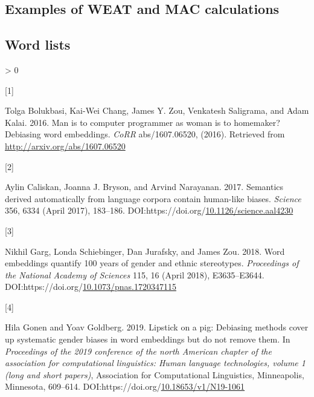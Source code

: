 \documentclass[
  10pt,
  dvipsnames,enabledeprecatedfontcommands, twocolumn]{scrartcl}
\newlength{\cslhangindent}
\newlength{\csllabelwidth}
\newenvironment{CSLReferences}[2] %
 {%
  \setlength{\parindent}{0pt}
  \ifodd #1 \everypar{\setlength{\hangindent}{\cslhangindent}}\ignorespaces\fi
  \ifnum #2 > 0
  \setlength{\parskip}{#2\baselineskip}
  \fi
 }%
 {}
\newcommand{\CSLLeftMargin}[1]{\parbox[t]{\csllabelwidth}{#1}}
\newcommand{\CSLRightInline}[1]{\parbox[t]{\linewidth - \csllabelwidth}{#1}\break}
\begin{document}
\hypertarget{examples-of-weat-and-mac-calculations}{%
\subsection{Examples of WEAT and MAC
calculations}\label{examples-of-weat-and-mac-calculations}}

\hypertarget{word-lists}{%
\subsection*{Word lists}\label{word-lists}}

\hypertarget{refs}{}
\begin{CSLReferences}{0}{0}
\leavevmode\hypertarget{ref-Bolukbasi2016man}{}%
\CSLLeftMargin{{[}1{]} }
\CSLRightInline{Tolga Bolukbasi, Kai-Wei Chang, James Y. Zou, Venkatesh
Saligrama, and Adam Kalai. 2016. Man is to computer programmer as woman
is to homemaker? Debiasing word embeddings. \emph{CoRR} abs/1607.06520,
(2016). Retrieved from \url{http://arxiv.org/abs/1607.06520}}

\leavevmode\hypertarget{ref-Caliskan2017semanticsBiases}{}%
\CSLLeftMargin{{[}2{]} }
\CSLRightInline{Aylin Caliskan, Joanna J. Bryson, and Arvind Narayanan.
2017. Semantics derived automatically from language corpora contain
human-like biases. \emph{Science} 356, 6334 (April 2017), 183--186.
DOI:https://doi.org/\href{https://doi.org/10.1126/science.aal4230}{10.1126/science.aal4230}}

\leavevmode\hypertarget{ref-Garg2018years}{}%
\CSLLeftMargin{{[}3{]} }
\CSLRightInline{Nikhil Garg, Londa Schiebinger, Dan Jurafsky, and James
Zou. 2018. Word embeddings quantify 100 years of gender and ethnic
stereotypes. \emph{Proceedings of the National Academy of Sciences} 115,
16 (April 2018), E3635--E3644.
DOI:https://doi.org/\href{https://doi.org/10.1073/pnas.1720347115}{10.1073/pnas.1720347115}}

\leavevmode\hypertarget{ref-Gonen2019lipstick}{}%
\CSLLeftMargin{{[}4{]} }
\CSLRightInline{Hila Gonen and Yoav Goldberg. 2019. Lipstick on a pig:
{D}ebiasing methods cover up systematic gender biases in word embeddings
but do not remove them. In \emph{Proceedings of the 2019 conference of
the north {A}merican chapter of the association for computational
linguistics: Human language technologies, volume 1 (long and short
papers)}, Association for Computational Linguistics, Minneapolis,
Minnesota, 609--614.
DOI:https://doi.org/\href{https://doi.org/10.18653/v1/N19-1061}{10.18653/v1/N19-1061}}


\end{CSLReferences}
\end{document}
